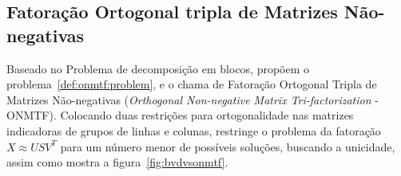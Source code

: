 \documentclass[
    12pt,                %
    oneside,            %
    a4paper,            %
    english,            %
    brazil                %
    ]{abntex2ppgsi}
\newtheorem{theorem}{Teorema}
\begin{document}


\subsection{Fatoração Ortogonal tripla de Matrizes Não-negativas}

Baseado no Problema de decomposição em blocos,  propõem o problema~\ref{def:onmtf:problem}, e o chama de Fatoração Ortogonal Tripla de Matrizes Não-negativas (\textit{Orthogonal Non-negative Matrix Tri-factorization} - ONMTF).
Colocando duas restrições para ortogonalidade nas matrizes indicadoras de grupos de linhas e colunas, restringe o problema da fatoração $X \approx USV^T$ para um número menor de possíveis soluções, buscando a unicidade, assim como mostra a figura~\ref{fig:bvdvsonmtf}.
\end{document}
